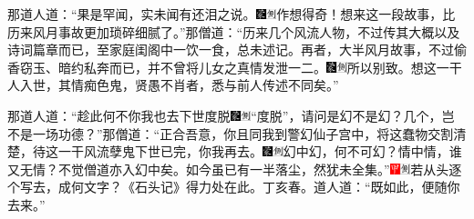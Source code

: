 那道人道：``果是罕闻，实未闻有还泪之说。{\includegraphics[width=3mm]{../Images/00006}\includegraphics[width=3mm]{../Images/00011}\footnotesize \kaishu 作想得奇！}想来这一段故事，比历来风月事故更加琐碎细腻了。''那僧道：``历来几个风流人物，不过传其大概以及诗词篇章而已，至家庭闺阁中一饮一食，总未述记。再者，大半风月故事，不过偷香窃玉、暗约私奔而已，并不曾将儿女之真情发泄一二。{\includegraphics[width=3mm]{../Images/00006}\includegraphics[width=3mm]{../Images/00011}\footnotesize \kaishu 所以别致。}想这一干人入世，其情痴色鬼，贤愚不肖者，悉与前人传述不同矣。''

那道人道：``趁此何不你我也去下世度脱{\includegraphics[width=3mm]{../Images/00006}\includegraphics[width=3mm]{../Images/00011}\footnotesize \kaishu ``度脱''，请问是幻不是幻？}几个，岂不是一场功德？''那僧道：``正合吾意，你且同我到警幻仙子宫中，将这蠢物交割清楚，待这一干风流孽鬼下世已完，你我再去。{\includegraphics[width=3mm]{../Images/00006}\includegraphics[width=3mm]{../Images/00011}\footnotesize \kaishu 幻中幻，何不可幻？情中情，谁又无情？不觉僧道亦入幻中矣。}如今虽已有一半落尘，然犹未全集。''{\includegraphics[width=3mm]{../Images/00002}\includegraphics[width=3mm]{../Images/00011}\footnotesize \kaishu 若从头逐个写去，成何文字？《石头记》得力处在此。丁亥春。}道人道：``既如此，便随你去来。''

